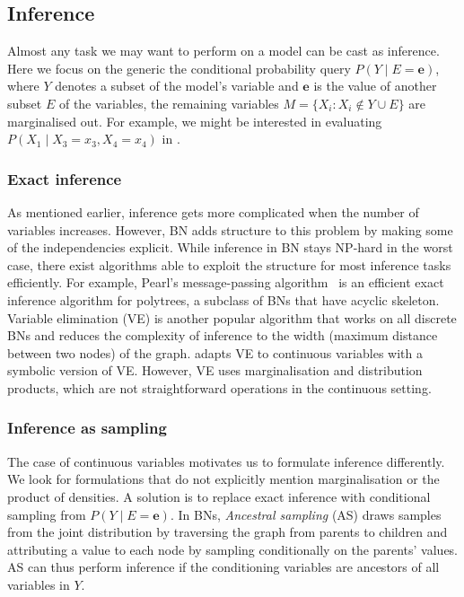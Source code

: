 \subsection{Inference}
Almost any task we may want to perform on a model can be cast as inference. Here we focus on the generic the conditional probability query $P(Y\mid E=\bm{e})$, where $Y$ denotes a subset of the model's variable and $\bm{e}$ is the value of another subset $E$ of the variables, the remaining variables $M = \{X_i: X_i \notin Y \cup E \}$ are marginalised out. For example, we might be interested in evaluating $P(X_1\mid X_3=x_3, X_4=x_4)$ in .

\subsubsection{Exact inference}
As mentioned earlier, inference gets more complicated when the number of variables increases. However, BN adds structure to this problem by making some of the independencies explicit. While inference in BN stays NP-hard in the worst case, there exist algorithms able to exploit the structure for most inference tasks efficiently. For example, Pearl's message-passing algorithm~\citep{pearl1987distributed} is an efficient exact inference algorithm for polytrees, a subclass of BNs that have acyclic skeleton. Variable elimination (VE) is another popular algorithm that works on all discrete BNs and reduces the complexity of inference to the width (maximum distance between two nodes) of the graph. \citet{sanner2012symbolic} adapts VE to continuous variables with a symbolic version of VE. However, VE uses marginalisation and distribution products, which are not straightforward operations in the continuous setting.

\subsubsection{Inference as sampling}
The case of continuous variables motivates us to formulate inference differently. We look for formulations that do not explicitly mention marginalisation or the product of densities. A solution is to replace exact inference with conditional sampling from $P(Y\mid E=\bm{e})$. In BNs, \textit{Ancestral sampling} (AS) draws samples from the joint distribution by traversing the graph from parents to children and attributing a value to each node by sampling conditionally on the parents' values. AS can thus perform inference if the conditioning variables are ancestors of all variables in $Y$.


